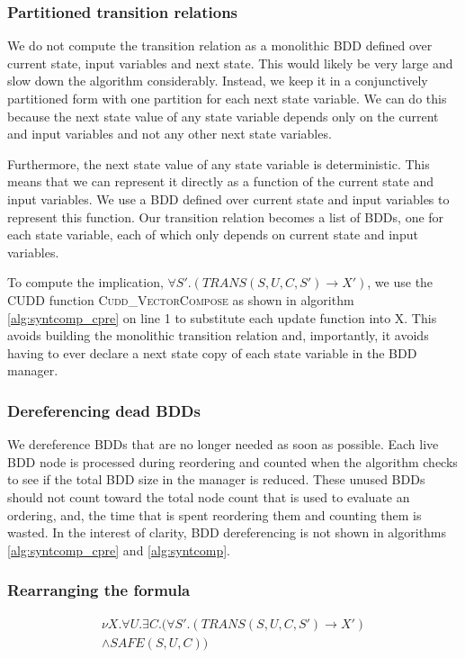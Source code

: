 \subsubsection{Partitioned transition relations}
We do not compute the transition relation as a monolithic BDD defined over current state, input variables and next state. This would likely be very large and slow down the algorithm considerably. Instead, we keep it in a conjunctively partitioned form with one partition for each next state variable. We can do this because the next state value of any state variable depends only on the current and input variables and not any other next state variables.

Furthermore, the next state value of any state variable is deterministic. This means that we can represent it directly as a function of the current state and input variables. We use a BDD defined over current state and input variables to represent this function. Our transition relation becomes a list of BDDs, one for each state variable, each of which only depends on current state and input variables. 

To compute the implication, $\forall S'. (TRANS(S, U, C, S') \rightarrow X')$, we use the CUDD function \textsc{Cudd\_VectorCompose} as shown in algorithm \ref{alg:syntcomp_cpre} on line 1 to substitute each update function into X. This avoids building the monolithic transition relation and, importantly, it avoids having to ever declare a next state copy of each state variable in the BDD manager. 

\subsubsection{Dereferencing dead BDDs}
We dereference BDDs that are no longer needed as soon as possible. Each live BDD node is processed during reordering and counted when the algorithm checks to see if the total BDD size in the manager is reduced. These unused BDDs should not count toward the total node count that is used to evaluate an ordering, and, the time that is spent reordering them and counting them is wasted. In the interest of clarity, BDD dereferencing is not shown in algorithms \ref{alg:syntcomp_cpre} and \ref{alg:syntcomp}.

\subsubsection{Rearranging the formula}
\begin{multline}
\label{eqn:mu2}
\nu X. \forall U. \exists C. (\forall S'. (TRANS(S, U, C, S') \rightarrow X') \\ \wedge SAFE(S, U, C))
\end{multline}


